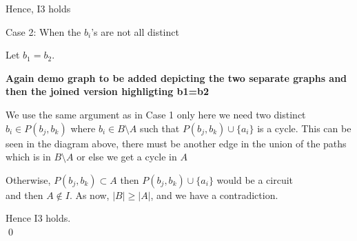 \documentclass{article}
\theoremstyle{plain}
\theoremstyle{definition}
\theoremstyle{remark}
\begin{document}
 \vspace{3mm}
 
\noindent Hence, I3 holds

\noindent Case 2: When the $b_i$'s are not all distinct

\noindent Let $ b_1 = b_2 $.

\textbf{Again demo graph to be added depicting the two separate graphs and then the joined version highligting b1=b2}

\noindent We use the same argument as in Case 1 only here we need two distinct $ b_i \in P( b_j, b_k) $ where $ b_i \in B \setminus A $ such that  $ P(b_j , b_k ) \cup \{ a_i \} $ is a cycle. This can be seen in the diagram above, there must be another edge in the union of the paths which is in $ B \setminus A$ or else we get a cycle in $A$

\vspace{2mm}

\noindent Otherwise, $ P(b_j,b_k) \subset A  $ then $ P(b_j,b_k) \cup \{ a_i \} $  would be a circuit\\ and then $ A \notin I $. As now, $ |B| \geq |A| $, and we have a contradiction.

\noindent Hence I3 holds.\\
\qed

 
 
\end{document}
